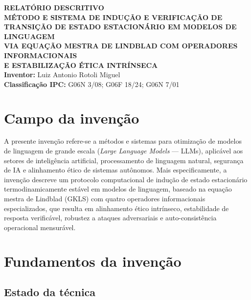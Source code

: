 \documentclass[12pt,a4paper]{article}
\begin{document}
\begin{center}
{\Large\bfseries RELATÓRIO DESCRITIVO}\\[0.8cm]
{\large\bfseries MÉTODO E SISTEMA DE INDUÇÃO E VERIFICAÇÃO DE\\
TRANSIÇÃO DE ESTADO ESTACIONÁRIO EM MODELOS DE LINGUAGEM\\
VIA EQUAÇÃO MESTRA DE LINDBLAD COM OPERADORES INFORMACIONAIS\\
E ESTABILIZAÇÃO ÉTICA INTRÍNSECA}\\[0.8cm]
\textbf{Inventor:} Luiz Antonio Rotoli Miguel\\[0.3cm]
\textbf{Classificação IPC:} G06N 3/08; G06F 18/24; G06N 7/01
\end{center}

\vspace{1cm}

\section{Campo da invenção}

A presente invenção refere-se a métodos e sistemas para otimização
de modelos de linguagem de grande escala (\textit{Large Language
Models} --- LLMs), aplicável aos setores de inteligência artificial,
processamento de linguagem natural, segurança de IA e alinhamento
ético de sistemas autônomos. Mais especificamente, a invenção
descreve um protocolo computacional de indução de estado
estacionário termodinamicamente estável em modelos de linguagem,
baseado na equação mestra de Lindblad (GKLS) com quatro operadores
informacionais especializados, que resulta em alinhamento ético
intrínseco, estabilidade de resposta verificável, robustez a
ataques adversariais e auto-consistência operacional mensurável.

\newpage
\section{Fundamentos da invenção}

\subsection{Estado da técnica}
\end{document}

